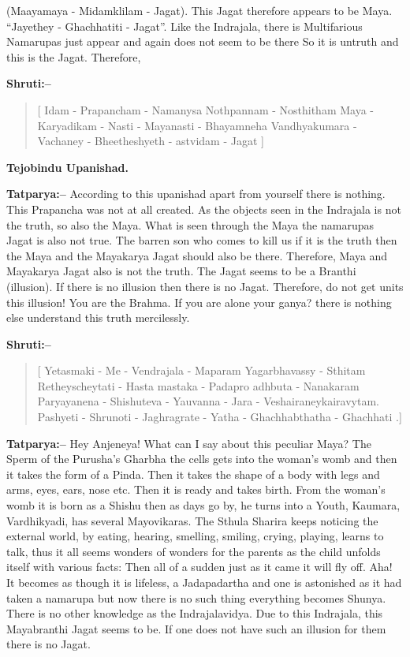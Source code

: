 (Maayamaya - Midamklilam - Jagat). This Jagat therefore appears to be Maya. “Jayethey - Ghachhatiti - Jagat”. Like the Indrajala, there is Multifarious Namarupas just appear and again does not seem to be there So it is untruth and this is the Jagat. Therefore,

\newpage

\textbf{Shruti:–}

\begin{verse}
[ Idam - Prapancham - Namanysa Nothpannam - Nosthi\break tham  Maya - Karyadikam - Nasti - Mayanasti - Bhaya\break mneha Vandhyakumara - Vachaney - Bheetheshyeth - astvidam - Jagat ]
\end{verse}

\begin{flushright}
\textbf{Tejobindu Upanishad.}
\end{flushright}

\textbf{Tatparya:–} According to this upanishad apart from yourself there is nothing. This Prapancha was not at all created. As the objects seen in the Indrajala is not the truth, so also the Maya. What is seen through the Maya the namarupas Jagat is also not true. The barren son who comes to kill us if it is the truth then the Maya and the Mayakarya Jagat should also be there. Therefore, Maya and Mayakarya Jagat also is not the truth. The Jagat seems to be a Branthi (illusion). If there is no illusion then there is no Jagat. Therefore, do not get units this illusion! You are the Brahma. If you are alone your ganya? there is nothing else understand this truth mercilessly.

\textbf{Shruti:–}

\begin{verse}
[ Yetasmaki - Me - Vendrajala - Maparam Yagarbhavassy - Sthitam  Retheyscheytati - Hasta mastaka - Padapro adhbuta - Nanakaram  Paryayanena - Shishuteva - Yauvanna - Jara - Veshairaneykairavytam. Pashyeti - Shrunoti - Jaghragrate - Yatha - Ghachhabthatha - Ghachhati .]
\end{verse}

\textbf{Tatparya:–} Hey Anjeneya! What can I say about this peculiar Maya? The Sperm of the Purusha's Gharbha the cells gets into the woman's womb and then it takes the form of a Pinda. Then it takes the shape of a body with legs and arms, eyes, ears, nose etc. Then it is ready and takes birth. From the woman's womb it is born as a Shishu then as days go by, he turns into a Youth, Kaumara, Vardhikyadi, has several Mayovikaras. The Sthula Sharira keeps noticing the external world, by eating, hearing, smelling, smiling, crying, playing, learns to talk, thus it all seems wonders of wonders for the parents as the child unfolds itself with various facts: Then all of a sudden just as it came it will fly off. Aha! It becomes as though it is lifeless, a Jadapadartha and one is astonished as it had taken a namarupa but now there is no such thing everything becomes Shunya. There is no other knowledge as the Indrajalavidya. Due to this Indrajala, this Mayabranthi Jagat seems to be. If one does not have such an illusion for them there is no Jagat.

